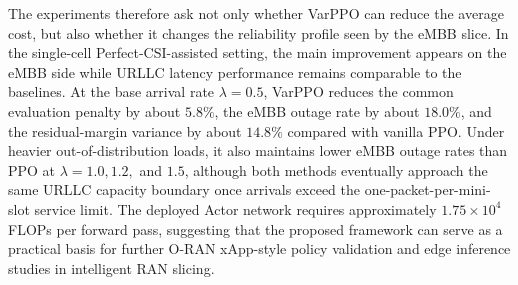 \documentclass[
  type   = bachelor,
  degree = academic,
  fontset = fandol,
]{njuthesis}
\begin{document}
\begin{abstract*}
The experiments therefore ask not only whether VarPPO can reduce the average cost, but also whether it changes the reliability profile seen by the eMBB slice. In the single-cell Perfect-CSI-assisted setting, the main improvement appears on the eMBB side while URLLC latency performance remains comparable to the baselines. At the base arrival rate 
\(\lambda=0.5\), VarPPO reduces the common evaluation penalty by about \(5.8\%\), the eMBB outage rate by about \(18.0\%\), and the residual-margin variance by about \(14.8\%\) compared with vanilla PPO. Under heavier out-of-distribution loads, it also maintains lower eMBB outage rates than PPO at \(\lambda=1.0,1.2,\) and \(1.5\), although both methods eventually approach the same URLLC capacity boundary once arrivals exceed the one-packet-per-mini-slot service limit. The deployed Actor network requires approximately \(1.75\times10^4\) FLOPs per forward pass, suggesting that the proposed framework can serve as a practical basis for further O-RAN xApp-style policy validation and edge inference studies in intelligent RAN slicing.
\end{abstract*}

\tableofcontents
\mainmatter



\printbibliography
\end{document}
